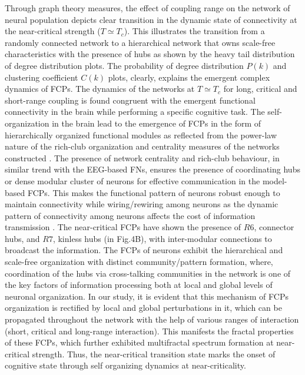 \documentclass[preprintnumbers,amsmath,amssymb,onecolumn]{revtex4}
\begin{document}
Through graph theory measures, the effect of coupling range on the network of neural population depicts clear transition in the dynamic state of connectivity at the near-critical strength ($T\simeq T_{c}$). This illustrates the transition from a randomly connected network to a hierarchical network that owns scale-free characteristics with the presence of hubs as shown by the heavy tail distribution of degree distribution plots. The probability of degree distribution $P(k)$ and clustering coefficient $C(k)$ plots, clearly, explains the emergent complex dynamics of FCPs. The dynamics of the networks at $T\simeq T_{c}$ for long, critical and short-range coupling is found congruent with the emergent functional connectivity in the brain while performing a specific cognitive task. The self-organization in the brain lead to the emergence of FCPs in the form of hierarchically organized functional modules as reflected from the power-law nature of the rich-club organization and centrality measures of the networks constructed \citep{ThomasYeo2015, Meunier2010}. The presence of network centrality and rich-club behaviour, in similar trend with the EEG-based FNs, ensures the presence of coordinating hubs or dense modular cluster of neurons for effective communication in the model-based FCPs. This makes the functional pattern of neurons robust enough to maintain connectivity while wiring/rewiring among neurons as the dynamic pattern of connectivity among neurons affects the cost of information transmission \citep{DeDomenico2016}. The near-critical FCPs have shown the presence of $R6$, connector hubs, and $R7$, kinless hubs (in Fig.4B), with inter-modular connections to broadcast the information. The FCPs of neurons exhibit the hierarchical and scale-free organization with distinct community/pattern formation, where, coordination of the hubs via cross-talking communities in the network is one of the key factors of information processing both at local and global levels of neuronal organization. In our study, it is evident that this mechanism of FCPs organization is rectified by local and global perturbations in it, which can be propagated throughout the network with the help of various ranges of interaction (short, critical and long-range interaction). This manifests the fractal properties of these FCPs, which further exhibited multifractal spectrum formation at near-critical strength. Thus, the near-critical transition state marks the onset of cognitive state through self organizing dynamics at near-criticality. \\
\end{document}
